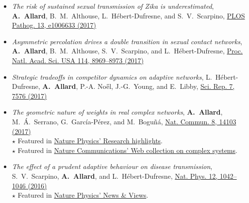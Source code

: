\documentclass[11pt]{article}
\begin{document}
\begin{itemize}
%
  \item \textit{The risk of sustained sexual transmission of Zika is underestimated}, \textbf{A.~Allard}\textsuperscript{}, B.~M.~Althouse\textsuperscript{}, L.~H\'ebert-Dufresne\textsuperscript{}, and S.~V.~Scarpino\textsuperscript{}, \href{http://dx.doi.org/10.1371/journal.ppat.1006633}{PLOS Pathog. 13, e1006633 (2017)}%
%
  \item \textit{Asymmetric percolation drives a double transition in sexual contact networks}, \textbf{A.~Allard}, B.~M.~Althouse, S.~V.~Scarpino, and L.~H\'ebert-Dufresne, \href{http://dx.doi.org/10.1073/pnas.1703073114}{Proc. Natl. Acad. Sci. USA 114, 8969--8973 (2017)}%
%
  \item \textit{Strategic tradeoffs in competitor dynamics on adaptive networks}, L.~H\'ebert-Dufresne, \textbf{A.~Allard}, P.-A. No\H{e}l, J.-G.~Young, and E.~Libby, \href{http://dx.doi.org/10.1038/s41598-017-07621-x}{Sci. Rep. 7, 7576 (2017)}%
%
  \item \textit{The geometric nature of weights in real complex networks}, \textbf{A.~Allard}, M.~\'A.~Serrano, G.~Garc\'ia-P\'erez, and M.~Bogu\~n\'a, \href{http://doi.org/10.1038/ncomms14103}{Nat. Commun. 8, 14103 (2017)}\\%
  {\footnotesize $\star$ Featured in \href{http://dx.doi.org/10.1038/nphys4046}{Nature Physics' Research highlights}.}\\
  {\footnotesize $\star$ Featured in \href{https://www.nature.com/collections/ycjylwzvmz/}{Nature Communications' Web collection on complex systems}.}
%
  \item \textit{The effect of a prudent adaptive behaviour on disease transmission}, S.~V.~Scarpino, \textbf{A.~Allard}, and L.~H\'ebert-Dufresne, \href{http://dx.doi.org/10.1038/nphys3832}{Nat. Phys. 12, 1042--1046 (2016)}\\%
  {\footnotesize $\star$ Featured in \href{http://dx.doi.org/10.1038/nphys3939}{Nature Physics' News \& Views}.}%

\end{itemize}
\end{document}
